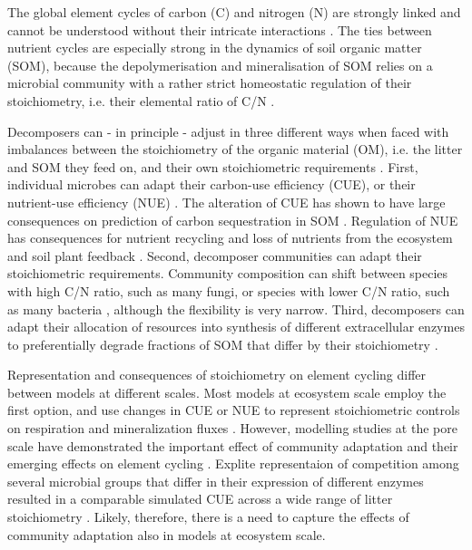 
\introduction 
The global element cycles of carbon (C) and nitrogen (N) are strongly linked
and cannot be understood without their intricate interactions 
\citep{Thornton07,Janssens10, Zaehle11}. 
The ties between nutrient cycles are especially strong
in the dynamics of soil organic matter (SOM), because the depolymerisation and mineralisation of SOM relies on a microbial community with a rather strict homeostatic regulation of their stoichiometry, i.e. their elemental ratio of C/N \citep{Sterner02, Zechmeister15}.


Decomposers can - in principle - adjust in three different ways when faced with imbalances between the stoichiometry of the organic material (OM), i.e. the litter and SOM they
feed on, and their own stoichiometric requirements \citep{Mooshammer14}.
First, individual microbes can adapt their carbon-use efficiency (CUE), or their nutrient-use
efficiency (NUE) \citep{Sinsabaugh13}. The alteration of CUE has shown to have
large consequences on prediction of carbon sequestration in SOM
\citep{Allison14a, Wieder13}.
Regulation of NUE has consequences for nutrient recycling and loss of nutrients
from the ecosystem \citep{Mooshammer14a} and soil plant feedback
\citep{Rastetter11}.
Second, decomposer communities can adapt their stoichiometric
requirements. Community composition can shift between species with high C/N
ratio, such as many fungi, or species with lower C/N ratio, such as many
bacteria \citep{Cleveland07, Xu13}, although the flexibility is very narrow.
Third, decomposers can adapt their allocation of resources into
synthesis of different extracellular enzymes to preferentially degrade
fractions of SOM that differ by their stoichiometry \citep{Moorhead12}.

Representation and consequences of stoichiometry on element cycling differ
between models at different scales. Most models at ecosystem scale employ the
first option, and use changes in CUE or NUE to represent stoichiometric controls
on respiration and mineralization fluxes \citep{Manzoni08}. However, modelling
studies at the pore scale have demonstrated the important effect of community
adaptation and their emerging effects on element cycling \citep{Allison05,
Resat11, Wang13}. Explite representaion of competition among several microbial
groups that differ in their expression of different enzymes resulted in a
comparable simulated CUE across a wide range of litter stoichiometry
\citep{Kaiser14}. Likely, therefore, there is a need to capture the effects of
community adaptation also in models at ecosystem scale.

